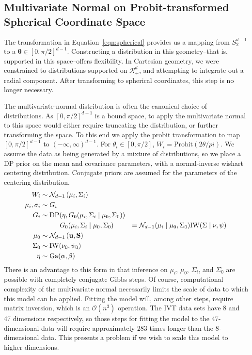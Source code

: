 
\subsection{Multivariate Normal on Probit-transformed Spherical Coordinate Space}
\label{method:npprobitnorm}
The transformation in Equation~\ref{eqn:spherical} provides us a mapping from $S_{2}^{d-1}$ to a
  $\bm{\theta} \in [0, \pi/2]^{d-1}$.  Constructing a distribution in this geometry--that is, supported
  in this space--offers flexibility.  In Cartesian geometry, we were constrained to distributions supported
  on $\mathcal{R}_+^{d}$, and attempting to integrate out a radial component.  After transforming to
  spherical coordinates, this step is no longer necessary.

The multivariate-normal distribution is often the canonical choice of distributions.  As $[0,\pi/2]^{d-1}$
  is a bound space, to apply the multivariate normal to this space would either require truncating the
  distribution, or further transforming the space.  To this end we apply the probit transformation to
  map $[0,\pi/2]^{d-1}$ to $(-\infty,\infty)^{d-1}$.  For $\theta_i \in [0,\pi/2]$,
  $W_i = \text{Probit}(2\theta / pi)$.  We assume the data as being generated by a mixture of distributions,
  so we place a DP prior on the mean and covariance parameters, with a normal-inverse wishart centering
  distribution.  Conjugate priors are assumed for the parameters of the centering distribution.
  \begin{equation}
    \begin{aligned}
                W_i &\sim \mathcal{N}_{d-1}\left(\mu_i, \Sigma_i\right)\\
    \mu_i, \sigma_i &\sim G_i\\
                G_i &\sim \text{DP}(\eta, G_0(\mu_i,\Sigma_i\mid\mu_0,\Sigma_0))\\
                    &\hspace{1cm}G_0(\mu_i,\Sigma_i\mid\mu_0,\Sigma_0) &=
                      \mathcal{N}_{d-1}(\mu_i\mid\mu_0,\Sigma_0)\text{IW}(\Sigma\mid\nu,\psi)\\
              \mu_0 &\sim \mathcal{N}_{d-1}\left({\bf u},{\bf S}\right)\\
           \Sigma_0 &\sim \text{IW}(\nu_0,\psi_0)\\
               \eta &\sim \text{Ga}(\alpha, \beta)
    \end{aligned}
  \end{equation}
  There is an advantage to this form in that inference on $\mu_i$, $\mu_0$, $\Sigma_i$, and $\Sigma_0$
  are possible with completely conjugate Gibbs steps.  Of course, computational complexity of the
  multivariate normal necessarily limits the scale of data to which this model can be applied.  Fitting
  the model will, among other steps, require matrix inversion, which is an $\mathcal{O}(n^3)$ operation.
  The IVT data sets have 8 and 47 dimensions respectively, so those steps for fitting the model to
  the 47-dimensional data will require approximately 283 times longer than the 8-dimensional data.
  This presents a problem if we wish to scale this model to higher dimensions.

